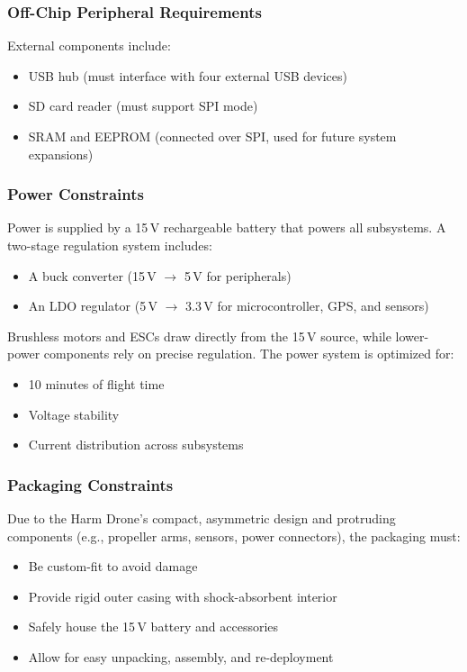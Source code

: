 \documentclass[12pt]{article}
\begin{document}
\subsubsection{Off-Chip Peripheral Requirements}

External components include:
\begin{itemize}
    \item USB hub (must interface with four external USB devices)
    \item SD card reader (must support SPI mode)
    \item SRAM and EEPROM (connected over SPI, used for future system expansions)
\end{itemize}

\subsubsection{Power Constraints}

Power is supplied by a 15\,V rechargeable battery that powers all subsystems. A two-stage regulation system includes:
\begin{itemize}
    \item A buck converter (15\,V $\rightarrow$ 5\,V for peripherals)
    \item An LDO regulator (5\,V $\rightarrow$ 3.3\,V for microcontroller, GPS, and sensors)
\end{itemize}

Brushless motors and ESCs draw directly from the 15\,V source, while lower-power components rely on precise regulation. The power system is optimized for:
\begin{itemize}
    \item 10 minutes of flight time
    \item Voltage stability
    \item Current distribution across subsystems
\end{itemize}

\subsubsection{Packaging Constraints}

Due to the Harm Drone’s compact, asymmetric design and protruding components (e.g., propeller arms, sensors, power connectors), the packaging must:
\begin{itemize}
    \item Be custom-fit to avoid damage
    \item Provide rigid outer casing with shock-absorbent interior
    \item Safely house the 15\,V battery and accessories
    \item Allow for easy unpacking, assembly, and re-deployment
\end{itemize}
\end{document}
